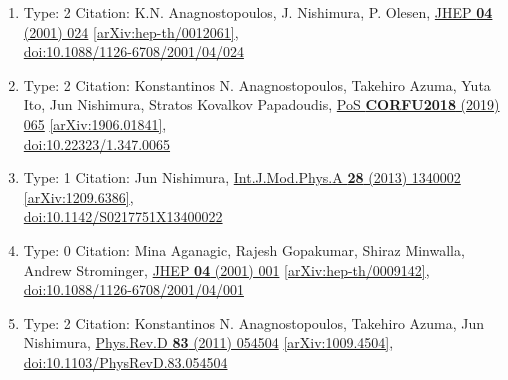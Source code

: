 \documentclass[a4paper,10pt]{article}
\begin{document}
\begin{enumerate}
\begin{enumerate}
  \item Type: 2 Citation: K.N. Anagnostopoulos, J. Nishimura, P. Olesen, \href{https://www.doi.org/10.1088/1126-6708/2001/04/024}{JHEP {\bf 04} (2001) 024}  \href{https://arxiv.org/abs/hep-th/0012061}{[arXiv:hep-th/0012061]},\\\href{https://www.doi.org/10.1088/1126-6708/2001/04/024}{doi:10.1088/1126-6708/2001/04/024}
  \item Type: 2 Citation: Konstantinos N. Anagnostopoulos, Takehiro Azuma, Yuta Ito, Jun Nishimura, Stratos Kovalkov Papadoudis, \href{https://www.doi.org/10.22323/1.347.0065}{PoS {\bf CORFU2018} (2019) 065}  \href{https://arxiv.org/abs/1906.01841}{[arXiv:1906.01841]},\\\href{https://www.doi.org/10.22323/1.347.0065}{doi:10.22323/1.347.0065}
  \item Type: 1 Citation: Jun Nishimura, \href{https://www.doi.org/10.1142/S0217751X13400022}{Int.J.Mod.Phys.A {\bf 28} (2013) 1340002}  \href{https://arxiv.org/abs/1209.6386}{[arXiv:1209.6386]},\\\href{https://www.doi.org/10.1142/S0217751X13400022}{doi:10.1142/S0217751X13400022}
  \item Type: 0 Citation: Mina Aganagic, Rajesh Gopakumar, Shiraz Minwalla, Andrew Strominger, \href{https://www.doi.org/10.1088/1126-6708/2001/04/001}{JHEP {\bf 04} (2001) 001}  \href{https://arxiv.org/abs/hep-th/0009142}{[arXiv:hep-th/0009142]},\\\href{https://www.doi.org/10.1088/1126-6708/2001/04/001}{doi:10.1088/1126-6708/2001/04/001}
  \item Type: 2 Citation: Konstantinos N. Anagnostopoulos, Takehiro Azuma, Jun Nishimura, \href{https://www.doi.org/10.1103/PhysRevD.83.054504}{Phys.Rev.D {\bf 83} (2011) 054504}  \href{https://arxiv.org/abs/1009.4504}{[arXiv:1009.4504]},\\\href{https://www.doi.org/10.1103/PhysRevD.83.054504}{doi:10.1103/PhysRevD.83.054504}

\end{enumerate}
\end{enumerate}
\end{document}
